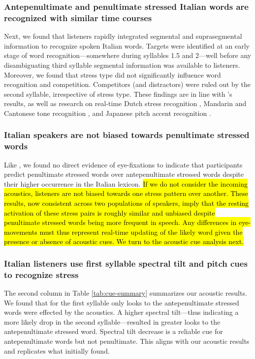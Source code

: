 \subsubsection{Antepenultimate and penultimate stressed Italian words are recognized with similar time courses}
Next, we found that listeners rapidly integrated segmental and suprasegmental information to recognize spoken Italian words. Targets were identified at an early stage of word recognition---somewhere during syllables 1.5 and 2---well before any disambiguating third syllable segmental information was available to listeners. Moreover, we found that stress type did not significantly influence word recognition and competition. Competitors (and distractors) were ruled out by the second syllable, irrespective of stress type. These findings are in line with \cite{Sulpizio_McQueen_2012}'s results, as well as research on real-time Dutch stress recognition \citep{Reinisch2010}, Mandarin and Cantonese tone recognition \citep{zou_2022, qin_2022, Nixon2016}, and Japanese pitch accent recognition \citep{Cutler1999, Ito2024}. 




\subsubsection{Italian speakers are not biased towards penultimate stressed words}
Like \cite{Sulpizio_McQueen_2012}, we found no direct evidence of eye-fixations to indicate that participants predict penultimate stressed words over antepenultimate stressed words despite their higher occurrence in the Italian lexicon. \hl{If we do not consider the incoming acoustics, listeners are not biased towards one stress pattern over another. These results, now consistent across two populations of speakers, imply that the resting activation of these stress pairs is roughly similar and unbiased despite penultimate stressed words being more frequent in speech. Any differences in eye-movements must thus represent real-time updating of the likely word given the presence or absence of acoustic cues. We turn to the acoustic cue analysis next.}

\subsubsection{Italian listeners use first syllable spectral tilt and pitch cues to recognize stress}
The second column in Table \ref{tab:cue-summary} summarizes our acoustic results. We found that for the first syllable only looks to the antepenultimate stressed words were effected by the acoustics. A higher spectral tilt---thus indicating a more likely drop in the second syllable---resulted in greater looks to the antepenultimate stressed word. Spectral tilt decrease is a reliable cue for antepenultimate words but not penultimate. This aligns with our acoustic results and replicates what \citep{Sulpizio_McQueen_2012} initially found. 

